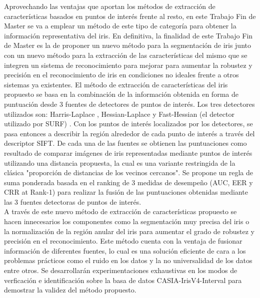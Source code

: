 Aprovechando las ventajas que aportan los métodos de extracción de características basados en puntos de interés frente al resto, en este Trabajo Fin de Master se va a emplear un método de este tipo de categoría para obtener la información representativa del iris. En definitiva, la finalidad de este Trabajo Fin de Master es la de proponer un nuevo método para la segmentación de iris junto con un nuevo método para la extracción de las características del mismo que se integren un sistema de reconocimiento para mejorar para aumentar la robustez y precisión en el reconocimiento de iris en condiciones no ideales frente a otros sistemas ya existentes. El método de extracción de características del iris propuesto se basa en la combinación de la información obtenida en forma de puntuación desde 3 fuentes de detectores de puntos de interés. Los tres detectores utilizados son: Harris-Laplace \cite{Reference20}, Hessian-Laplace \cite{Reference20} y Fast-Hessian (el detector utilizado por SURF) \cite{Reference21}. Con los puntos de interés localizados por los detectores, se pasa entonces a describir la región alrededor de cada punto de interés a través del descriptor SIFT. De cada una de las fuentes se obtienen las puntuaciones como resultado de comparar imágenes de iris representadas mediante puntos de interés utilizando una distancia propuesta, la cual es una variante restringida de la clásica "proporción de distancias de los vecinos cercanos". Se propone un regla de suma ponderada basada en el ranking de 3 medidas de desempeño (AUC, EER y CRR at Rank-1) para realizar la fusión de las puntuaciones obtenidas mediante las 3 fuentes detectoras de puntos de interés. \\

A través de este nuevo método de extracción de características propuesto se hacen innecesarios los componentes como la segmentación muy precisa del iris o la normalización de la región anular del iris para aumentar el grado de robustez y precisión en el reconocimiento. Este método cuenta con la ventaja de fusionar información de diferentes fuentes, lo cual es una solución eficiente de cara a los problemas prácticos como el ruido en los datos y la no universalidad de los datos entre otros. Se desarrollarán experimentaciones exhaustivas en los modos de verficación e identificación sobre la basa de datos CASIA-IrisV4-Interval para demostrar la validez del método propuesto. \\



